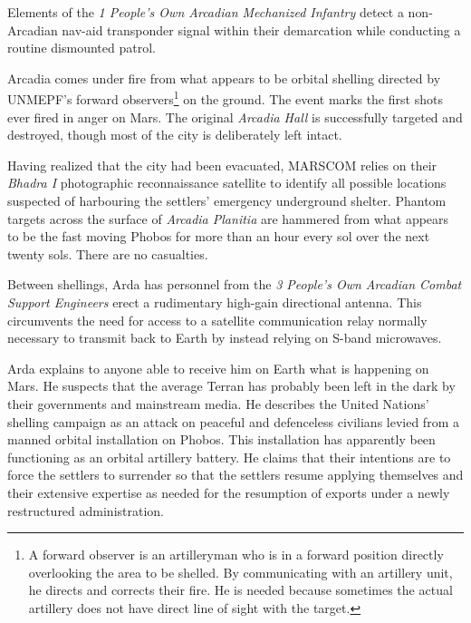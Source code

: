 

Elements of the {\it 1 People's Own Arcadian Mechanized Infantry} detect a non-Arcadian nav-aid transponder signal within their demarcation while conducting a routine dismounted patrol.
\StopTimelineDate

Arcadia comes under fire from what appears to be orbital shelling directed by UNMEPF's forward observers\footnote{A forward observer is an artilleryman who is in a forward position directly overlooking the area to be shelled. By communicating with an artillery unit, he directs and corrects their fire. He is needed because sometimes the actual artillery does not have direct line of sight with the target.} on the ground. The event marks the first shots ever fired in anger on Mars. The original {\it Arcadia Hall} is successfully targeted and destroyed, though most of the city is deliberately left intact. 

Having realized that the city had been evacuated, MARSCOM relies on their {\it Bhadra I} photographic reconnaissance satellite to identify all possible locations suspected of harbouring the settlers' emergency underground shelter. Phantom targets across the surface of {\it Arcadia Planitia} are hammered from what appears to be the fast moving Phobos for more than an hour every sol over the next twenty sols. There are no casualties.

Between shellings, Arda has personnel from the {\it 3 People's Own Arcadian Combat Support Engineers} erect a rudimentary high-gain directional antenna. This circumvents the need for access to a satellite communication relay normally necessary to transmit back to Earth by instead relying on S-band microwaves. 

Arda explains to anyone able to receive him on Earth what is happening on Mars. He suspects that the average Terran has probably been left in the dark by their governments and mainstream media. He describes the United Nations' shelling campaign as an attack on peaceful and defenceless civilians levied from a manned orbital installation on Phobos. This installation has apparently been functioning as an orbital artillery battery. He claims that their intentions are to force the settlers to surrender so that the settlers resume applying themselves and their extensive expertise as needed for the resumption of exports under a newly restructured administration.

